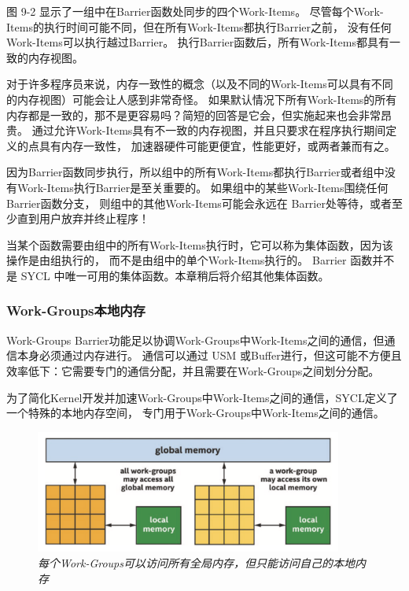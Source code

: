 图 9-2 显示了一组中在Barrier函数处同步的四个Work-Items。 
尽管每个Work-Items的执行时间可能不同，但在所有Work-Items都执行Barrier之前，
没有任何Work-Items可以执行越过Barrier。 
执行Barrier函数后，所有Work-Items都具有一致的内存视图。

\begin{remark}[为什么默认情况下内存不一致？]
对于许多程序员来说，内存一致性的概念（以及不同的Work-Items可以具有不同的内存视图）可能会让人感到非常奇怪。
如果默认情况下所有Work-Items的所有内存都是一致的，那不是更容易吗？简短的回答是它会，但实施起来也会非常昂贵。
通过允许Work-Items具有不一致的内存视图，并且只要求在程序执行期间定义的点具有内存一致性，
加速器硬件可能更便宜，性能更好，或两者兼而有之。
\end{remark}

因为Barrier函数同步执行，所以组中的所有Work-Items都执行Barrier或者组中没有Work-Items执行Barrier是至关重要的。 
如果组中的某些Work-Items围绕任何 Barrier函数分支，
则组中的其他Work-Items可能会永远在 Barrier处等待，或者至少直到用户放弃并终止程序！

\begin{remark}[集体函数]
当某个函数需要由组中的所有Work-Items执行时，它可以称为集体函数，因为该操作是由组执行的，
而不是由组中的单个Work-Items执行的。
Barrier 函数并不是 SYCL 中唯一可用的集体函数。本章稍后将介绍其他集体函数。
\end{remark}

\subsubsection{Work-Groups本地内存}
Work-Groups Barrier功能足以协调Work-Groups中Work-Items之间的通信，但通信本身必须通过内存进行。 
通信可以通过 USM 或Buffer进行，但这可能不方便且效率低下：它需要专门的通信分配，并且需要在Work-Groups之间划分分配。

为了简化Kernel开发并加速Work-Groups中Work-Items之间的通信，SYCL定义了一个特殊的本地内存空间，
专门用于Work-Groups中Work-Items之间的通信。

\begin{figure}[H]
	\centering
	\includegraphics[width=0.9\textwidth]{figs/F9.3.png}
	\caption{\textit{每个Work-Groups可以访问所有全局内存，但只能访问自己的本地内存 }}
\end{figure}

